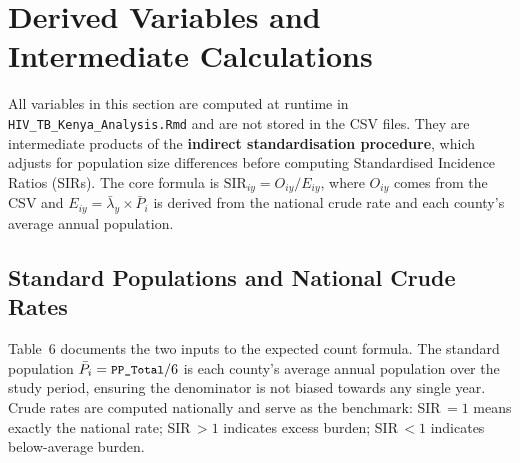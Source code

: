 \documentclass[11pt,a4paper]{article}
\newcommand{\code}[1]{\texttt{\small #1}}
\begin{document}
\section{Derived Variables and Intermediate Calculations}

All variables in this section are computed at runtime in
\code{HIV\_TB\_Kenya\_Analysis.Rmd} and are not stored in the CSV files.
They are intermediate products of the \textbf{indirect standardisation
procedure}, which adjusts for population size differences before computing
Standardised Incidence Ratios (SIRs). The core formula is
$\mathrm{SIR}_{iy} = O_{iy}/E_{iy}$, where $O_{iy}$ comes from the CSV
and $E_{iy} = \bar{\lambda}_y \times \bar{P}_i$ is derived from the
national crude rate and each county's average annual population.

\subsection{Standard Populations and National Crude Rates}

Table~6 documents the two inputs to the expected count formula. The standard
population $\bar{P}_i = \code{PP\_Total}/6$ is each county's average annual
population over the study period, ensuring the denominator is not biased
towards any single year. Crude rates are computed nationally and serve as the
benchmark: SIR\,$= 1$ means exactly the national rate; SIR\,$> 1$ indicates
excess burden; SIR\,$< 1$ indicates below-average burden.
\end{document}
